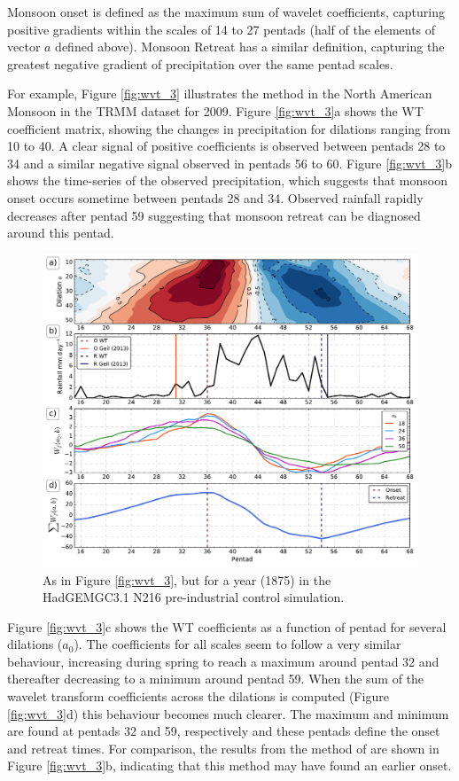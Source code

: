  Monsoon onset is defined as the maximum sum of wavelet coefficients, capturing positive gradients within the scales of 14 to 27 pentads (half of the elements of vector $a$ defined above). Monsoon Retreat has a similar definition, capturing the greatest negative gradient of precipitation over the same pentad scales.

For example, Figure \ref{fig:wvt_3} illustrates the method in the North American Monsoon in the TRMM dataset for 2009. Figure \ref{fig:wvt_3}a shows the WT coefficient matrix, showing the changes in precipitation for dilations ranging from 10 to 40. A clear signal of positive coefficients is observed between pentads 28 to 34  and a similar negative signal observed in pentads 56 to 60. Figure \ref{fig:wvt_3}b shows the time-series of the observed precipitation, which suggests that monsoon onset occurs sometime between pentads 28 and 34. Observed rainfall rapidly decreases after pentad 59 suggesting that monsoon retreat can be diagnosed around this pentad.

\begin{figure}
 \includegraphics[width=\linewidth]{figures/nam_n216.pdf}
\caption[Example determination of onset and retreat in HadGEM3 N216]{ As in Figure \ref{fig:wvt_3}, but for a year (1875) in the HadGEMGC3.1 N216 pre-industrial control simulation.  }
\label{fig:s1_n216}
\end{figure}

 Figure \ref{fig:wvt_3}c shows the WT coefficients as a function of pentad for several dilations ($a_0$). The coefficients for all scales seem to follow a very similar behaviour, increasing during spring to reach a maximum around pentad 32 and thereafter decreasing to a minimum around pentad 59. When the sum of the wavelet transform coefficients across the dilations is computed (Figure \ref{fig:wvt_3}d) this behaviour becomes much clearer. The maximum and minimum are found at pentads 32 and 59, respectively and these pentads define the onset and retreat times. For comparison, the results from the method of \cite{geil2013} are shown in Figure \ref{fig:wvt_3}b, indicating that this method may have found an earlier onset. 
 
